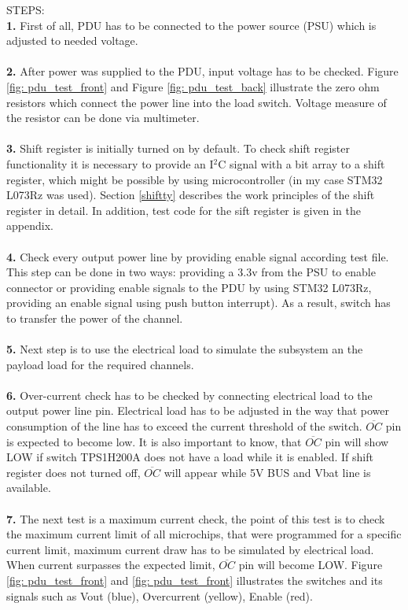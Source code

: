 STEPS:\\
\textbf{1.}  First of all, PDU has to be connected to the power source (PSU) which is adjusted to needed voltage.\\ \\
\textbf{2.} After power was supplied to the PDU, input voltage has to be checked. Figure \ref{fig: pdu_test_front} and Figure \ref{fig: pdu_test_back} illustrate the zero ohm resistors which connect the power line into the load switch. Voltage measure of the resistor can be done via multimeter. \\ \\
\textbf{3.} Shift register is initially turned on by default. To check shift register functionality it is necessary to provide an I$^2$C signal with a bit array to a shift register, which might be possible by using microcontroller (in my case STM32 L073Rz was used). Section \ref{shiftty} describes the work principles of the shift register in detail. In addition, test code for the sift register is given in the appendix. \\ \\
\textbf{4.} Check every output power line by providing enable signal according test file. This step can be done in two ways: providing a 3.3v from the PSU to enable connector or providing
enable signals to the PDU by using STM32 L073Rz, providing an enable signal using push button interrupt). As a result, switch has to transfer the power of the channel.\\ \\
\textbf{5.} Next step is to use the electrical load to simulate the subsystem an the payload load for the required channels.\\ \\
\textbf{6.} Over-current check has to be checked by connecting electrical load to the output power line
pin. Electrical load has to be adjusted in the way that power consumption of the line has to exceed the current
threshold of the switch. $\overline{OC}$ pin is expected to become low.
It is also important to know, that $\overline{OC}$ pin will show LOW if switch TPS1H200A does not have a load while it is enabled. If shift register does not turned off, $\overline{OC}$ will appear while 5V BUS and Vbat line is available.\\ \\
\textbf{7.} The next test is a maximum current check, the point of this test is to check the maximum current limit of all microchips, that were programmed for a
specific current limit, maximum current draw has to be simulated by electrical load. When current surpasses the expected
limit, $\overline{OC}$ pin will become LOW.
Figure \ref{fig: pdu_test_front} and \ref{fig: pdu_test_front} illustrates the switches and its signals such as Vout (blue), Overcurrent (yellow), Enable (red).

